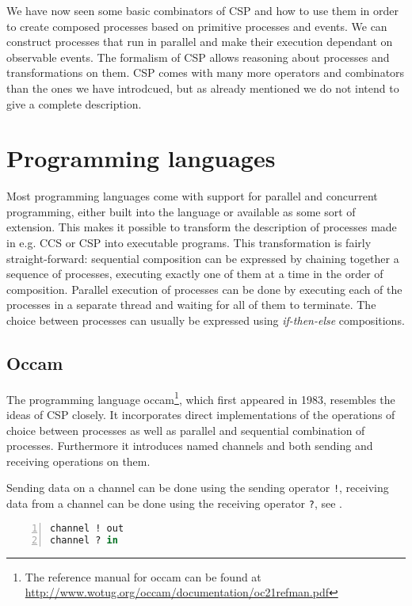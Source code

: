 We have now seen some basic combinators of \textsc{CSP} and how to use them in order to create composed processes based on primitive processes and events. We can construct processes that run in parallel and make their execution dependant on observable events. The formalism of \textsc{CSP} allows reasoning about processes and transformations on them. \textsc{CSP} comes with many more operators and combinators than the ones we have introdcued, but as already mentioned we do not intend to give a complete description.


\section{Programming languages}
Most programming languages come with support for parallel and concurrent programming, either built into the language or available as some sort of extension. This makes it possible to transform the description of processes made in e.g. \textsc{CCS} or \textsc{CSP} into executable programs. This transformation is fairly straight-forward: sequential composition can be expressed by chaining together a sequence of processes, executing exactly one of them at a time in the order of composition. Parallel execution of processes can be done by executing each of the processes in a separate thread and waiting for all of them to terminate. The choice between processes can usually be expressed using \textit{if-then-else} compositions.

\clearpage
\subsection{Occam}
The programming language \textsf{occam}\footnote{The reference manual for \textsf{occam} can be found at \url{http://www.wotug.org/occam/documentation/oc21refman.pdf}}, which first appeared in 1983, resembles the ideas of CSP closely. It incorporates direct implementations of the operations of choice between processes as well as parallel and sequential combination of processes. Furthermore it introduces named channels and both sending and receiving operations on them.

Sending data on a channel can be done using the sending operator \texttt{!}, receiving data from a channel can be done using the receiving operator \texttt{?}, see .

\begin{lstlisting}[language=Caml, caption=Sending data over a channel and receiving data from a channel in \textsf{occam}., label=lst:occam_send_receive, numbers=left, frame=bt]
channel ! out
channel ? in
\end{lstlisting}

